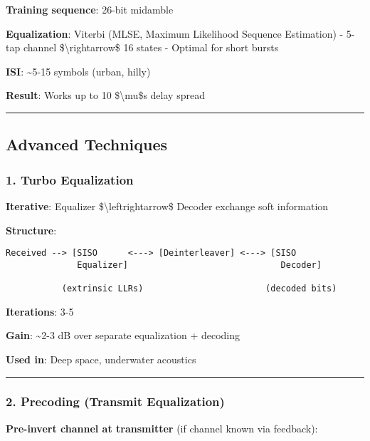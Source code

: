 \textbf{Training sequence}: 26-bit midamble

\textbf{Equalization}: Viterbi (MLSE, Maximum Likelihood Sequence
Estimation) - 5-tap channel \$\textbackslash rightarrow\$ 16 states -
Optimal for short bursts

\textbf{ISI}: \textasciitilde5-15 symbols (urban, hilly)

\textbf{Result}: Works up to 10 \$\textbackslash mu\$s delay spread

\begin{center}\rule{0.5\linewidth}{0.5pt}\end{center}

\subsection{Advanced Techniques}\label{advanced-techniques}

\subsubsection{1. Turbo Equalization}\label{turbo-equalization}

\textbf{Iterative}: Equalizer \$\textbackslash leftrightarrow\$ Decoder
exchange soft information

\textbf{Structure}:

\begin{verbatim}
Received --> [SISO      <---> [Deinterleaver] <---> [SISO
              Equalizer]                              Decoder]
                                                       
           (extrinsic LLRs)                        (decoded bits)
\end{verbatim}

\textbf{Iterations}: 3-5

\textbf{Gain}: \textasciitilde2-3 dB over separate equalization +
decoding

\textbf{Used in}: Deep space, underwater acoustics

\begin{center}\rule{0.5\linewidth}{0.5pt}\end{center}

\subsubsection{2. Precoding (Transmit
Equalization)}\label{precoding-transmit-equalization}

\textbf{Pre-invert channel at transmitter} (if channel known via
feedback):

